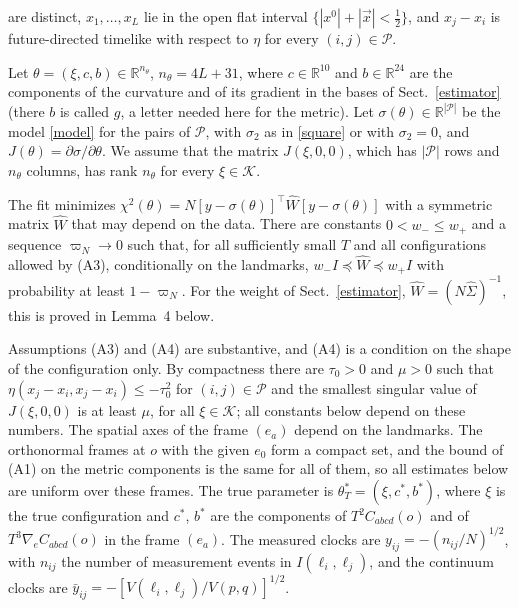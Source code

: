 \begin{description}
are distinct, $x_1,\dots,x_L$ lie in the open flat interval
$\{|x^0|+|\vec x|<\tfrac12\}$, and $x_j-x_i$ is future-directed timelike
with respect to $\eta$ for every $(i,j)\in\mathcal P$.
\item[(A4) Conditioning.] Let $\theta=(\xi,c,b)\in\mathbb R^{n_\theta}$,
$n_\theta=4L+31$, where $c\in\mathbb R^{10}$ and $b\in\mathbb R^{24}$ are
the components of the curvature and of its gradient in the bases of
Sect.~\ref{estimator} (there $b$ is called $g$, a letter needed here for
the metric). Let $\sigma(\theta)\in\mathbb R^{|\mathcal P|}$ be the model
\eqref{model} for the pairs of $\mathcal P$, with $\sigma_2$ as in
\eqref{square} or with $\sigma_2=0$, and
$J(\theta)=\partial\sigma/\partial\theta$. We assume that the matrix
$J(\xi,0,0)$, which has $|\mathcal P|$ rows and $n_\theta$ columns, has rank
$n_\theta$ for every $\xi\in\mathcal K$.
\item[(A5) Weights.] The fit minimizes
$\chi^2(\theta)=N[y-\sigma(\theta)]^{\!\top}\widehat W[y-\sigma(\theta)]$
with a symmetric matrix $\widehat W$ that may depend on the data. There are
constants $0<w_-\le w_+$ and a sequence $\varpi_N\to0$ such that, for all
sufficiently small $T$ and all configurations allowed by (A3), conditionally
on the landmarks, $w_-I\preceq\widehat W\preceq w_+I$ with probability at
least $1-\varpi_N$. For the weight of Sect.~\ref{estimator},
$\widehat W=(N\widehat\Sigma)^{-1}$, this is proved in Lemma~4 below.
\end{description}

Assumptions (A3) and (A4) are substantive, and (A4) is a condition on the
shape of the configuration only. By compactness there are $\tau_0>0$ and
$\mu>0$ such that $\eta(x_j-x_i,x_j-x_i)\le-\tau_0^2$ for
$(i,j)\in\mathcal P$ and the smallest singular value of $J(\xi,0,0)$ is at
least $\mu$, for all $\xi\in\mathcal K$; all constants below depend on
these numbers. The spatial axes of the frame $(e_a)$ depend on the
landmarks. The orthonormal frames at $o$ with the given $e_0$ form a compact
set, and the bound of (A1) on the metric components is the same for all of
them, so all estimates below are uniform over these frames. The true
parameter is $\theta^*_T=(\xi,c^*,b^*)$, where $\xi$ is the true
configuration and $c^*$, $b^*$ are the components of $T^2C_{abcd}(o)$ and of
$T^3\nabla_eC_{abcd}(o)$ in the frame $(e_a)$. The measured clocks are
$y_{ij}=-(n_{ij}/N)^{1/2}$, with $n_{ij}$ the number of measurement events in
$I(\ell_i,\ell_j)$, and the continuum clocks are
$\bar y_{ij}=-[V(\ell_i,\ell_j)/V(p,q)]^{1/2}$.

